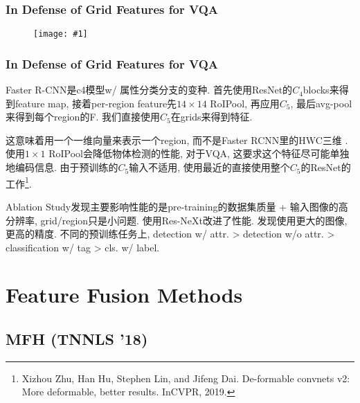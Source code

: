 \documentclass{beamer}
\newcommand{\cfig}[2]{
    \begin{figure}[htbp]
    \centering
    \texttt{[image: \#1]}
\end{figure}
}
\begin{document}
\begin{frame}
    \frametitle{In Defense of Grid Features for VQA}

    \cfig{gridfeat-comp.png}{1.0}

\end{frame}

\begin{frame}
    \frametitle{In Defense of Grid Features for VQA}

    Faster R-CNN是c4模型w/ 属性分类分支的变种. 首先使用ResNet的$C_4$blocks来得到feature map, 接着per-region feature先$14\times 14$ RoIPool, 再应用$C_5$, 最后avg-pool来得到每个region的F. 我们直接使用$C_5$在grids来得到特征.

    这意味着用一个一维向量来表示一个region, 而不是Faster RCNN里的HWC三维 .使用$1\times 1$ RoIPool会降低物体检测的性能, 对于VQA, 这要求这个特征尽可能单独地编码信息. 由于预训练的$C_5$输入不适用, 使用最近的直接使用整个$C_5$的ResNet的工作\footnote{
        Xizhou Zhu, Han Hu, Stephen Lin, and Jifeng Dai.  De-formable convnets v2: More deformable, better results. InCVPR, 2019.
    }.

    Ablation Study发现主要影响性能的是pre-training的数据集质量 + 输入图像的高分辨率, grid/region只是小问题. 使用Res-NeXt改进了性能. 发现使用更大的图像, 更高的精度. 不同的预训练任务上, detection w/ attr. > detection w/o attr. > classification w/ tag > cls. w/ label.

\end{frame}



    


\section{Feature Fusion Methods}

\subsection{MFH (TNNLS '18)}
\end{document}
